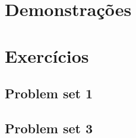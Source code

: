 \documentclass[12pt, a4paper]{article}
\begin{document}

\pagebreak
\tableofcontents
\pagebreak

\section{Demonstrações}



\pagebreak

\section{Exercícios}
\subsection{Problem set 1}

\pagebreak
\subsection{Problem set 3}






\end{document}
